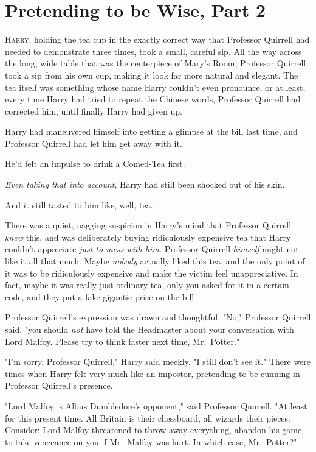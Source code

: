 \chapter{Pretending to be Wise, Part 2}

\lettrine{H}{arry}, holding
the tea cup in the exactly correct way that Professor Quirrell had needed to
demonstrate three times, took a small, careful sip. All the way across the
long, wide table that was the centerpiece of Mary's Room, Professor Quirrell
took a sip from his own cup, making it look far more natural and elegant. The
tea itself was something whose name Harry couldn't even pronounce, or at least,
every time Harry had tried to repeat the Chinese words, Professor Quirrell had
corrected him, until finally Harry had given up.

Harry had maneuvered himself into getting a glimpse at the bill last time, and
Professor Quirrell had let him get away with it.

He'd felt an impulse to drink a Comed-Tea first.

\emph{Even taking that into account}, Harry had still been shocked out of his
skin.

And it still tasted to him like, well, tea.

There was a quiet, nagging suspicion in Harry's mind that Professor Quirrell
\emph{knew} this, and was deliberately buying ridiculously expensive tea that
Harry couldn't appreciate \emph{just to mess with him.} Professor Quirrell
\emph{himself} might not like it all that much. Maybe \emph{nobody} actually
liked this tea, and the only point of it was to be ridiculously expensive and
make the victim feel unappreciative. In fact, maybe it was really just ordinary
tea, only you asked for it in a certain code, and they put a fake gigantic
price on the bill{\el}

Professor Quirrell's expression was drawn and thoughtful. "No," Professor
Quirrell said, "you should \emph{not} have told the Headmaster about your
conversation with Lord Malfoy. Please try to think faster next time,
Mr.~Potter."

"I'm sorry, Professor Quirrell," Harry said meekly. "I still don't see it."
There were times when Harry felt very much like an impostor, pretending to be
cunning in Professor Quirrell's presence.

"Lord Malfoy is Albus Dumbledore's opponent," said Professor Quirrell. "At
least for this present time. All Britain is their chessboard, all wizards their
pieces. Consider: Lord Malfoy threatened to throw away everything, abandon his
game, to take vengeance on you if Mr.~Malfoy was hurt. In which case,
Mr.~Potter{\el}?"

